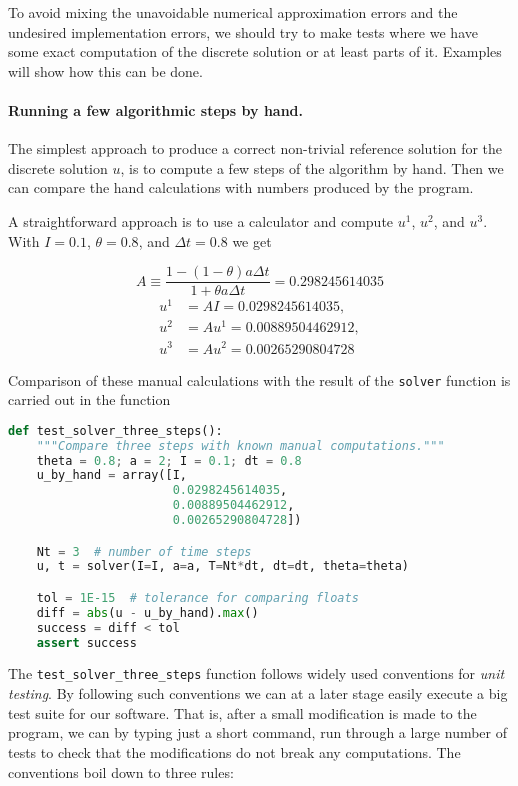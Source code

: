 \documentclass[graybox,sectrefs,envcountresetchap,open=right,final]{svmonodo}
\begin{document}
To avoid
mixing the unavoidable numerical approximation errors and the
undesired implementation errors, we should try to make tests where
we have some exact
computation of the discrete solution or at least parts of it.
Examples will show how this can be done.

\paragraph{Running a few algorithmic steps by hand.}
The simplest approach to produce a correct non-trivial reference
solution for the discrete solution $u$, is to compute a few steps of
the algorithm by hand. Then we can compare the hand calculations with
numbers produced by the program.

A straightforward approach is to use a calculator and
compute $u^1$, $u^2$, and $u^3$. With $I=0.1$, $\theta=0.8$,
and $\Delta t =0.8$ we get

\[ A\equiv \frac{1 - (1-\theta) a\Delta t}{1 + \theta a \Delta t} = 0.298245614035\]
\begin{align*}
u^1 &= AI=0.0298245614035,\\ 
u^2 &= Au^1= 0.00889504462912,\\ 
u^3 &=Au^2= 0.00265290804728
\end{align*}


Comparison of these manual calculations with the result of the
\texttt{solver} function is carried out in the function

\begin{lstlisting}[language=Python,style=blue1_bluegreen]
def test_solver_three_steps():
    """Compare three steps with known manual computations."""
    theta = 0.8; a = 2; I = 0.1; dt = 0.8
    u_by_hand = array([I,
                       0.0298245614035,
                       0.00889504462912,
                       0.00265290804728])

    Nt = 3  # number of time steps
    u, t = solver(I=I, a=a, T=Nt*dt, dt=dt, theta=theta)

    tol = 1E-15  # tolerance for comparing floats
    diff = abs(u - u_by_hand).max()
    success = diff < tol
    assert success
\end{lstlisting}
The \Verb!test_solver_three_steps! function follows widely used conventions
for \emph{unit testing}. By following such conventions we can at a later
stage easily execute a big test suite for our software. That is, after
a small modification is made to the program, we can by typing just
a short command, run through a large number of tests to check that the
modifications do not break any computations.
The conventions boil down to three rules:
\end{document}
